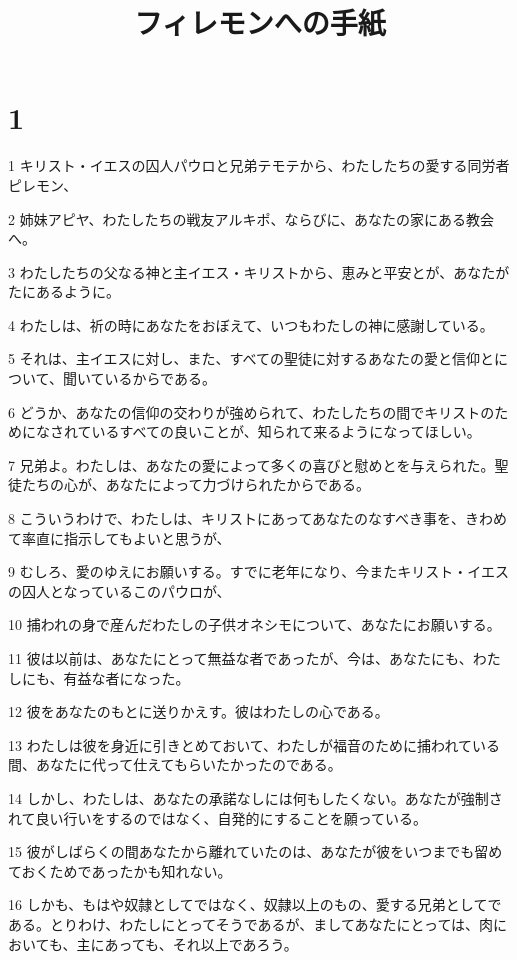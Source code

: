 

\title{フィレモンへの手紙}


\chapter{1}

\par 1 キリスト・イエスの囚人パウロと兄弟テモテから、わたしたちの愛する同労者ピレモン、
\par 2 姉妹アピヤ、わたしたちの戦友アルキポ、ならびに、あなたの家にある教会へ。
\par 3 わたしたちの父なる神と主イエス・キリストから、恵みと平安とが、あなたがたにあるように。
\par 4 わたしは、祈の時にあなたをおぼえて、いつもわたしの神に感謝している。
\par 5 それは、主イエスに対し、また、すべての聖徒に対するあなたの愛と信仰とについて、聞いているからである。
\par 6 どうか、あなたの信仰の交わりが強められて、わたしたちの間でキリストのためになされているすべての良いことが、知られて来るようになってほしい。
\par 7 兄弟よ。わたしは、あなたの愛によって多くの喜びと慰めとを与えられた。聖徒たちの心が、あなたによって力づけられたからである。
\par 8 こういうわけで、わたしは、キリストにあってあなたのなすべき事を、きわめて率直に指示してもよいと思うが、
\par 9 むしろ、愛のゆえにお願いする。すでに老年になり、今またキリスト・イエスの囚人となっているこのパウロが、
\par 10 捕われの身で産んだわたしの子供オネシモについて、あなたにお願いする。
\par 11 彼は以前は、あなたにとって無益な者であったが、今は、あなたにも、わたしにも、有益な者になった。
\par 12 彼をあなたのもとに送りかえす。彼はわたしの心である。
\par 13 わたしは彼を身近に引きとめておいて、わたしが福音のために捕われている間、あなたに代って仕えてもらいたかったのである。
\par 14 しかし、わたしは、あなたの承諾なしには何もしたくない。あなたが強制されて良い行いをするのではなく、自発的にすることを願っている。
\par 15 彼がしばらくの間あなたから離れていたのは、あなたが彼をいつまでも留めておくためであったかも知れない。
\par 16 しかも、もはや奴隷としてではなく、奴隷以上のもの、愛する兄弟としてである。とりわけ、わたしにとってそうであるが、ましてあなたにとっては、肉においても、主にあっても、それ以上であろう。
